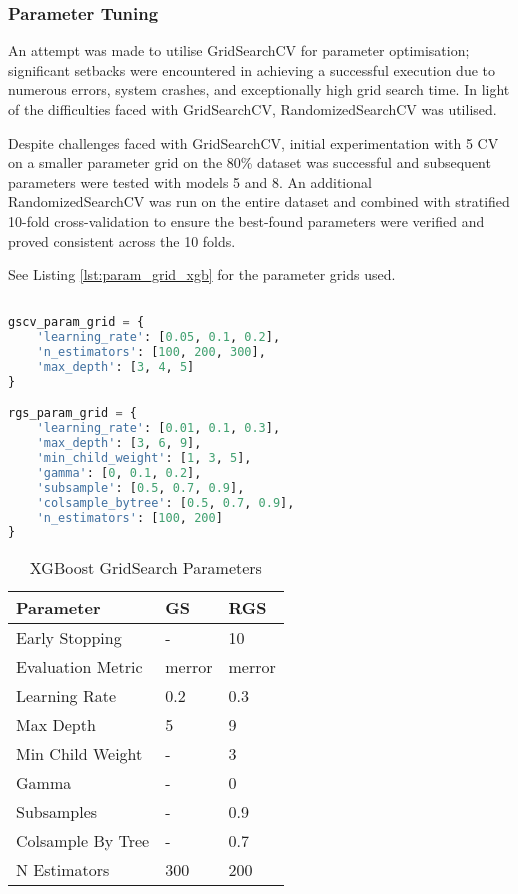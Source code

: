 \subsubsection*{Parameter Tuning}

An attempt was made to utilise GridSearchCV for parameter optimisation; significant setbacks were encountered in achieving a successful execution due to numerous errors, system crashes, and exceptionally high grid search time. In light of the difficulties faced with GridSearchCV, RandomizedSearchCV was utilised. 

Despite challenges faced with GridSearchCV, initial experimentation with 5 CV on a smaller parameter grid on the 80\% dataset was successful and subsequent parameters were tested with models 5 and 8. An additional RandomizedSearchCV was run on the entire dataset and combined with stratified 10-fold cross-validation to ensure the best-found parameters were verified and proved consistent across the 10 folds.

See Listing \ref{lst:param_grid_xgb} for the parameter grids used.

\medskip
	
\begin{lstlisting}[language=Python, caption={Grid Search Parameters For XGBoost}, label= lst:param_grid_xgb]

gscv_param_grid = {
    'learning_rate': [0.05, 0.1, 0.2],
    'n_estimators': [100, 200, 300],
    'max_depth': [3, 4, 5]
}

rgs_param_grid = {
    'learning_rate': [0.01, 0.1, 0.3],
    'max_depth': [3, 6, 9],
    'min_child_weight': [1, 3, 5],
    'gamma': [0, 0.1, 0.2],
    'subsample': [0.5, 0.7, 0.9],
    'colsample_bytree': [0.5, 0.7, 0.9],
    'n_estimators': [100, 200]
}
\end{lstlisting}

\begin{table}[H]
\captionsetup{justification=centering} 
\centering
\caption{XGBoost GridSearch Parameters}
\begin{tabular}{lll}
\hline
\textbf{Parameter} & \textbf{GS} & \textbf{RGS} \\ \hline
Early Stopping & - & 10 \\
Evaluation Metric & merror & merror \\
Learning Rate & 0.2 & 0.3 \\
Max Depth & 5 & 9 \\
Min Child Weight & - & 3 \\
Gamma & - & 0 \\
Subsamples & - & 0.9 \\
Colsample By Tree & - & 0.7 \\
N Estimators & 300 &  200 \\ \hline
\end{tabular}
\label{tab:xg_gs_parameters}
\end{table}

